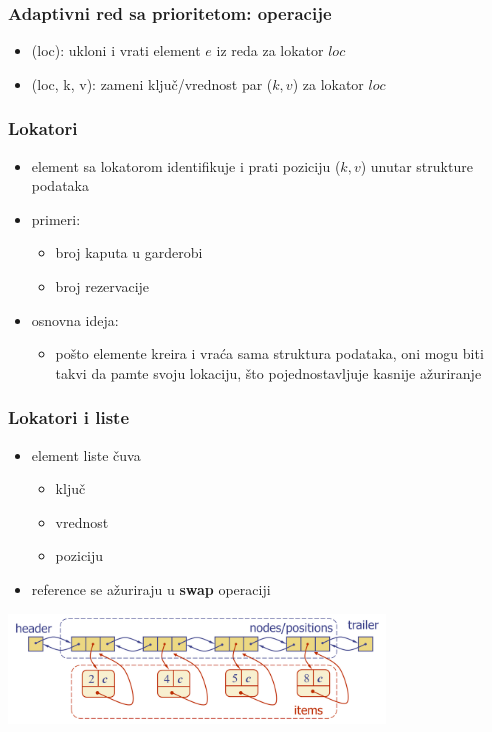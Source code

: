 \documentclass[compress,aspectratio=169]{beamer}
\begin{document}
\begin{frame}[fragile]
  \frametitle{Adaptivni red sa prioritetom: operacije}
  \begin{itemize}
    \item {}(loc): ukloni i vrati element $e$ iz reda za lokator
    $loc$
    \item {}(loc, k, v): zameni ključ/vrednost par ($k, v$) za
    lokator $loc$
  \end{itemize}
\end{frame}

\begin{frame}[fragile]
  \frametitle{Lokatori}
  \begin{itemize}
    \item element sa lokatorom identifikuje i prati poziciju ($k, v$) unutar
    strukture podataka
    \item primeri:
    \begin{itemize}
      \item broj kaputa u garderobi
      \item broj rezervacije 
    \end{itemize}
    \item osnovna ideja:
    \begin{itemize}
      \item pošto elemente kreira i vraća sama struktura podataka, oni mogu biti
      takvi da pamte svoju lokaciju, što pojednostavljuje kasnije ažuriranje
    \end{itemize}
  \end{itemize}
\end{frame}

\begin{frame}[fragile]
  \frametitle{Lokatori i liste}
  \begin{itemize}
    \item element liste čuva
    \begin{itemize}
      \item ključ
      \item vrednost
      \item poziciju 
    \end{itemize}
    \item reference se ažuriraju u \textbf{swap} operaciji
  \end{itemize}
  \begin{center}
    \includegraphics[width=10cm]{asp-09-pic19.png}
  \end{center}
\end{frame}
\end{document}
